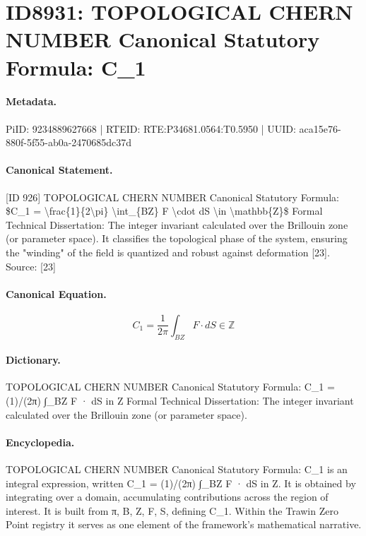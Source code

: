 \section*{ID8931: TOPOLOGICAL CHERN NUMBER Canonical Statutory Formula: C\_1}
\paragraph{Metadata.}
PiID: 9234889627668 | RTEID: RTE:P34681.0564:T0.5950 | UUID: aca15e76-880f-5f55-ab0a-2470685dc37d

\paragraph{Canonical Statement.}
[ID 926] TOPOLOGICAL CHERN NUMBER Canonical Statutory Formula: \$C\_1 = \textbackslash{}frac\{1\}\{2\textbackslash{}pi\} \textbackslash{}int\_\{BZ\} F \textbackslash{}cdot dS \textbackslash{}in \textbackslash{}mathbb\{Z\}\$ Formal Technical Dissertation: The integer invariant calculated over the Brillouin zone (or parameter space). It classifies the topological phase of the system, ensuring the "winding" of the field is quantized and robust against deformation [23]. Source: [23]

\paragraph{Canonical Equation.}
\[
C_1 = \frac{1}{2\pi} \int_{BZ} F \cdot dS \in \mathbb{Z}
\]

\paragraph{Dictionary.}
TOPOLOGICAL CHERN NUMBER Canonical Statutory Formula: C\_1 = (1)/(2π) ∫\_BZ F · dS in Z Formal Technical Dissertation: The integer invariant calculated over the Brillouin zone (or parameter space).

\paragraph{Encyclopedia.}
TOPOLOGICAL CHERN NUMBER Canonical Statutory Formula: C\_1 is an integral expression, written C\_1 = (1)/(2π) ∫\_BZ F · dS in Z. It is obtained by integrating over a domain, accumulating contributions across the region of interest. It is built from π, B, Z, F, S, defining C\_1. Within the Trawin Zero Point registry it serves as one element of the framework's mathematical narrative.
